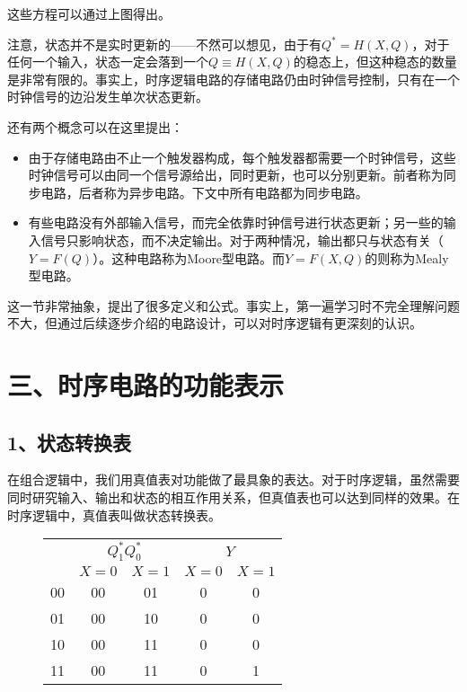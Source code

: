 \documentclass[UTF8]{ctexart}
\begin{document}
这些方程可以通过上图得出。

注意，状态并不是实时更新的——不然可以想见，由于有$Q^*=H(X,Q)$，对于任何一个输入，状态一定会落到一个$Q\equiv H(X,Q)$的稳态上，但这种稳态的数量是非常有限的。事实上，时序逻辑电路的存储电路仍由时钟信号控制，只有在一个时钟信号的边沿发生单次状态更新。

还有两个概念可以在这里提出：

\begin{itemize}
\item 由于存储电路由不止一个触发器构成，每个触发器都需要一个时钟信号，这些时钟信号可以由同一个信号源给出，同时更新，也可以分别更新。前者称为同步电路，后者称为异步电路。下文中所有电路都为同步电路。
\item 有些电路没有外部输入信号，而完全依靠时钟信号进行状态更新；另一些的输入信号只影响状态，而不决定输出。对于两种情况，输出都只与状态有关（$Y=F(Q)$）。这种电路称为Moore型电路。而$Y=F(X,Q)$的则称为Mealy型电路。
\end{itemize}

这一节非常抽象，提出了很多定义和公式。事实上，第一遍学习时不完全理解问题不大，但通过后续逐步介绍的电路设计，可以对时序逻辑有更深刻的认识。

\section*{三、时序电路的功能表示}
\subsection*{1、状态转换表}
在组合逻辑中，我们用真值表对功能做了最具象的表达。对于时序逻辑，虽然需要同时研究输入、输出和状态的相互作用关系，但真值表也可以达到同样的效果。在时序逻辑中，真值表叫做状态转换表。

\begin{figure}
    \begin{tabular}{|c|c|c|c|c|}\hline\rowcolor{lightgray}
        &\multicolumn{2}{c|}{$Q^*_1Q^*_0$}&\multicolumn{2}{c|}{$Y$}\\\cline{2-5}\rowcolor{lightgray}
        \multirow{-2}{*}{$Q_1Q_0$}&$X=0$&$X=1$&$X=0$&$X=1$\\\hline
        00&00&01&0&0\\\hline
        01&00&10&0&0\\\hline
        10&00&11&0&0\\\hline
        11&00&11&0&1\\\hline
    \end{tabular}
\end{figure}
\end{document}
